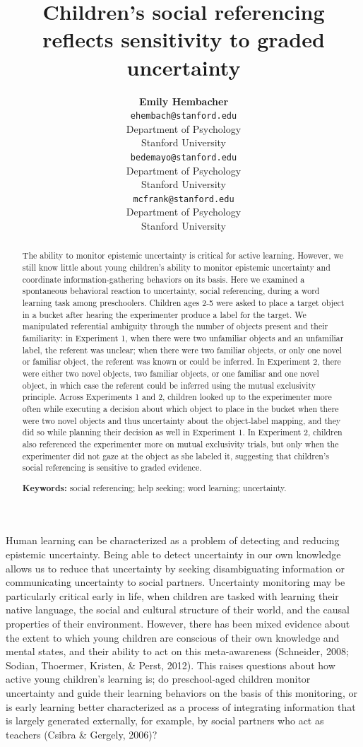 \documentclass[10pt, letterpaper]{article}
\title{Children's social referencing reflects sensitivity to graded uncertainty}
\author{{\large \bf Emily  Hembacher} \\ \texttt{ehembach@stanford.edu} \\ Department of Psychology \\ Stanford University \And {\large \bf Benjamin deMayo} \\ \texttt{bedemayo@stanford.edu} \\ Department of Psychology \\ Stanford University \And {\large \bf Michael C. Frank} \\ \texttt{mcfrank@stanford.edu} \\ Department of Psychology \\ Stanford University}
\begin{document}
\maketitle

\begin{abstract}
The ability to monitor epistemic uncertainty is critical for active
learning. However, we still know little about young children's ability
to monitor epistemic uncertainty and coordinate information-gathering
behaviors on its basis. Here we examined a spontaneous behavioral
reaction to uncertainty, social referencing, during a word learning task
among preschoolers. Children ages 2-5 were asked to place a target
object in a bucket after hearing the experimenter produce a label for
the target. We manipulated referential ambiguity through the number of
objects present and their familiarity: in Experiment 1, when there were
two unfamiliar objects and an unfamiliar label, the referent was
unclear; when there were two familiar objects, or only one novel or
familiar object, the referent was known or could be inferred. In
Experiment 2, there were either two novel objects, two familiar objects,
or one familiar and one novel object, in which case the referent could
be inferred using the mutual exclusivity principle. Across Experiments 1
and 2, children looked up to the experimenter more often while executing
a decision about which object to place in the bucket when there were two
novel objects and thus uncertainty about the object-label mapping, and
they did so while planning their decision as well in Experiment 1. In
Experiment 2, children also referenced the experimenter more on mutual
exclusivity trials, but only when the experimenter did not gaze at the
object as she labeled it, suggesting that children's social referencing
is sensitive to graded evidence.

\textbf{Keywords:}
social referencing; help seeking; word learning; uncertainty.
\end{abstract}

Human learning can be characterized as a problem of detecting and
reducing epistemic uncertainty. Being able to detect uncertainty in our
own knowledge allows us to reduce that uncertainty by seeking
disambiguating information or communicating uncertainty to social
partners. Uncertainty monitoring may be particularly critical early in
life, when children are tasked with learning their native language, the
social and cultural structure of their world, and the causal properties
of their environment. However, there has been mixed evidence about the
extent to which young children are conscious of their own knowledge and
mental states, and their ability to act on this meta-awareness
(Schneider, 2008; Sodian, Thoermer, Kristen, \& Perst, 2012). This
raises questions about how active young children's learning is; do
preschool-aged children monitor uncertainty and guide their learning
behaviors on the basis of this monitoring, or is early learning better
characterized as a process of integrating information that is largely
generated externally, for example, by social partners who act as
teachers (Csibra \& Gergely, 2006)?
\end{document}

